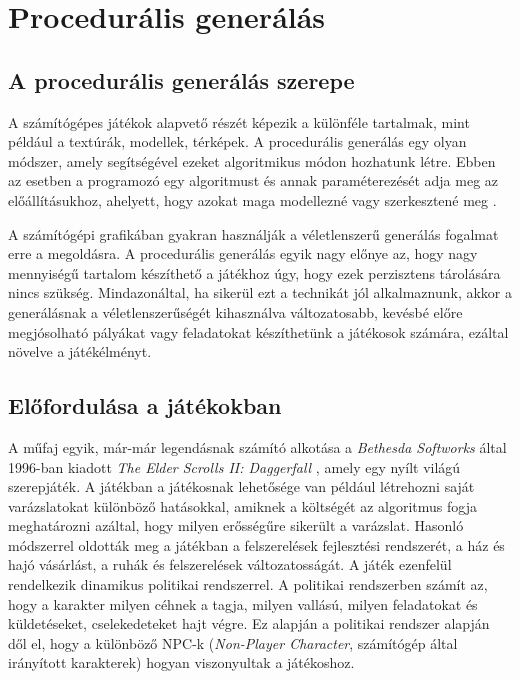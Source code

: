 \chapter{Procedurális generálás}

\section{A procedurális generálás szerepe}

A számítógépes játékok alapvető részét képezik a különféle tartalmak, mint például a textúrák, modellek, térképek. A procedurális generálás egy olyan módszer, amely segítségével ezeket algoritmikus módon hozhatunk létre. Ebben az esetben a programozó egy algoritmust és annak paraméterezését adja meg az előállításukhoz, ahelyett, hogy azokat maga modellezné vagy szerkesztené meg \cite{ProceduralGeneration}.

A számítógépi grafikában gyakran használják a véletlenszerű generálás fogalmat erre a megoldásra. A procedurális generálás egyik nagy előnye az, hogy nagy mennyiségű tartalom készíthető a játékhoz úgy, hogy ezek perzisztens tárolására nincs szükség. Mindazonáltal, ha sikerül ezt a technikát jól alkalmaznunk, akkor a generálásnak a véletlenszerűségét kihasználva változatosabb, kevésbé előre megjósolható pályákat vagy feladatokat készíthetünk a játékosok számára, ezáltal növelve a játékélményt.  

\section{Előfordulása a játékokban}

A műfaj egyik, már-már legendásnak számító alkotása a \textit{Bethesda Softworks} által 1996-ban kiadott \textit{The Elder Scrolls II: Daggerfall} \cite{Daggerfall}, amely egy nyílt világú szerepjáték. A játékban a játékosnak lehetősége van például létrehozni saját varázslatokat különböző hatásokkal, amiknek a költségét az algoritmus fogja meghatározni azáltal, hogy milyen erősségűre sikerült a varázslat. Hasonló módszerrel oldották meg a játékban a felszerelések fejlesztési rendszerét, a ház és hajó vásárlást, a ruhák és felszerelések változatosságát. A játék ezenfelül rendelkezik dinamikus politikai rendszerrel. A politikai rendszerben számít az, hogy a karakter milyen céhnek a tagja, milyen vallású, milyen feladatokat és küldetéseket, cselekedeteket hajt végre. Ez alapján a politikai rendszer alapján dől el, hogy a különböző NPC-k (\textit{Non-Player Character}, számítógép által irányított karakterek) hogyan viszonyultak a játékoshoz. 

